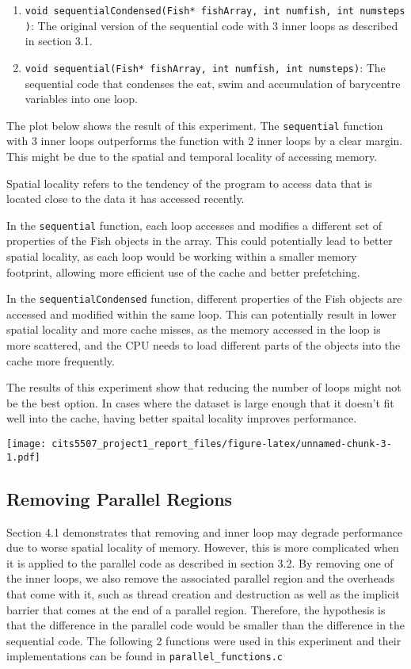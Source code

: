 \documentclass[
]{article}
\begin{document}
\begin{enumerate}
\def\labelenumi{\arabic{enumi}.}
\item
  \texttt{void\ sequentialCondensed(Fish*\ fishArray,\ int\ numfish,\ int\ numsteps)}:
  The original version of the sequential code with 3 inner loops as
  described in section 3.1.
\item
  \texttt{void\ sequential(Fish*\ fishArray,\ int\ numfish,\ int\ numsteps)}:
  The sequential code that condenses the eat, swim and accumulation of
  barycentre variables into one loop.
\end{enumerate}

The plot below shows the result of this experiment. The
\texttt{sequential} function with 3 inner loops outperforms the function
with 2 inner loops by a clear margin. This might be due to the spatial
and temporal locality of accessing memory.

Spatial locality refers to the tendency of the program to access data
that is located close to the data it has accessed recently.

In the \texttt{sequential} function, each loop accesses and modifies a
different set of properties of the Fish objects in the array. This could
potentially lead to better spatial locality, as each loop would be
working within a smaller memory footprint, allowing more efficient use
of the cache and better prefetching.

In the \texttt{sequentialCondensed} function, different properties of
the Fish objects are accessed and modified within the same loop. This
can potentially result in lower spatial locality and more cache misses,
as the memory accessed in the loop is more scattered, and the CPU needs
to load different parts of the objects into the cache more frequently.

The results of this experiment show that reducing the number of loops
might not be the best option. In cases where the dataset is large enough
that it doesn't fit well into the cache, having better spaital locality
improves performance.

\texttt{[image: cits5507\_project1\_report\_files/figure-latex/unnamed-chunk-3-1.pdf]}

\hypertarget{removing-parallel-regions}{%
\subsection{Removing Parallel Regions}\label{removing-parallel-regions}}

Section 4.1 demonstrates that removing and inner loop may degrade
performance due to worse spatial locality of memory. However, this is
more complicated when it is applied to the parallel code as described in
section 3.2. By removing one of the inner loops, we also remove the
associated parallel region and the overheads that come with it, such as
thread creation and destruction as well as the implicit barrier that
comes at the end of a parallel region. Therefore, the hypothesis is that
the difference in the parallel code would be smaller than the difference
in the sequential code. The following 2 functions were used in this
experiment and their implementations can be found in
\texttt{parallel\_functions.c}
\end{document}
